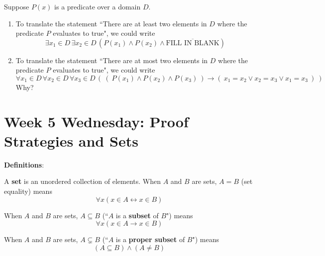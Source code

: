 \documentclass[12pt, oneside]{article}
\begin{document}
Suppose $P(x)$ is  a predicate over a domain $D$.
\begin{enumerate}
    \item To translate the statement
    ``There are at least two  elements in $D$
    where the predicate $P$ evaluates to true", we
    could  write
    \[
    \exists  x_1 \in D \, \exists x_2 \in D  \, (P(x_1) \wedge P(x_2) \wedge \overline{\text{FILL IN BLANK}})
    \]
    \vfill
    \item  To translate the statement
    ``There are at most two  elements in $D$
    where the predicate $P$ evaluates to true", we
    could write
    \[
    \forall  x_1 \in D \, \forall x_2 \in D \, \forall x_3 \in  D \, \left(~ (~P(x_1) \wedge P(x_2)  \wedge P(x_3) ~) \to (~ x_1 = x_2 \vee x_2 = x_3 \vee x_1 = x_3~)~\right)
    \]
    Why?
    \vfill
\end{enumerate} 
\newpage
\section*{Week 5 Wednesday: Proof Strategies and Sets}


{\bf Definitions}:

A {\bf set} is an  unordered collection of  elements.
When $A$ and  $B$ are sets,  $A = B$ (set equality) means  
\[
    \forall x  ( x\in A \leftrightarrow x \in B)
\]

When $A$ and  $B$ are sets, $A \subseteq B$ (``$A$ is a {\bf subset} of $B$") means 
\[
    \forall x  (x \in A  \to x  \in B)
\]

When $A$ and  $B$ are sets,  $A \subsetneq B$ (``$A$ is a {\bf proper subset} of $B$") means 
\[
    (A\subseteq B) \wedge  (A \neq B)
\] 



\end{document}
